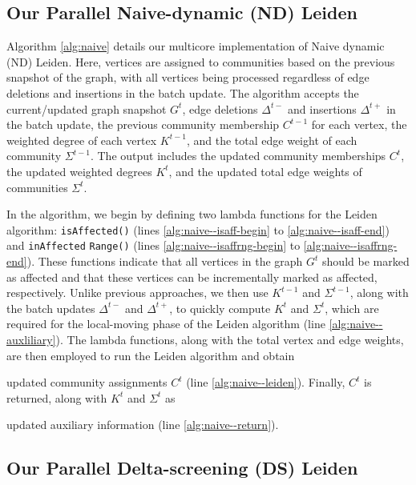 \subsection{Our Parallel Naive-dynamic (ND) Leiden}
\label{sec:our-naive}

Algorithm \ref{alg:naive} details our multicore implementation of Naive dynamic (ND) Leiden. Here, vertices are assigned to communities based on the previous snapshot of the graph, with all vertices being processed regardless of edge deletions and insertions in the batch update. The algorithm accepts the current/updated graph snapshot $G^t$, edge deletions $\Delta^{t-}$ and insertions $\Delta^{t+}$ in the batch update, the previous community membership $C^{t-1}$ for each vertex, the weighted degree of each vertex $K^{t-1}$, and the total edge weight of each community $\Sigma^{t-1}$. The output includes the updated community memberships $C^t$, the updated weighted degrees $K^t$, and the updated total edge weights of communities $\Sigma^t$.

In the algorithm, we begin by defining two lambda functions for the Leiden algorithm: \texttt{isAffected()} (lines \ref{alg:naive--isaff-begin} to \ref{alg:naive--isaff-end}) and \texttt{inAffected} \texttt{Range()} (lines \ref{alg:naive--isaffrng-begin} to \ref{alg:naive--isaffrng-end}). These functions indicate that all vertices in the graph $G^t$ should be marked as affected and that these vertices can be incrementally marked as affected, respectively. Unlike previous approaches, we then use $K^{t-1}$ and $\Sigma^{t-1}$, along with the batch updates $\Delta^{t-}$ and $\Delta^{t+}$, to quickly compute $K^t$ and $\Sigma^t$, which are required for the local-moving phase of the Leiden algorithm (line \ref{alg:naive--auxliliary}). The lambda functions, along with the total vertex and edge weights, are then employed to run the Leiden algorithm and obtain updated community assignments $C^t$ (line \ref{alg:naive--leiden}). Finally, $C^t$ is returned, along with $K^t$ and $\Sigma^t$ as updated auxiliary information (line \ref{alg:naive--return}).







\subsection{Our Parallel Delta-screening (DS) Leiden}
\label{sec:our-delta}

